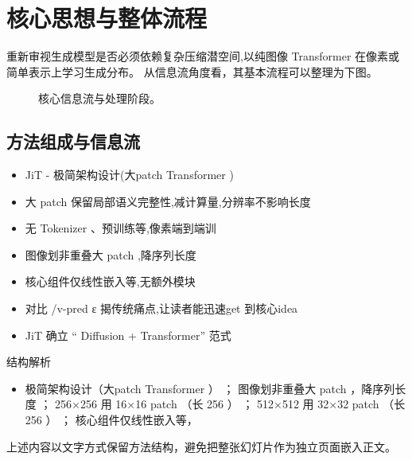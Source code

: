 \documentclass[UTF8,11pt,a4paper]{ctexart}
\begin{document}
\section{核心思想与整体流程}
重新审视生成模型是否必须依赖复杂压缩潜空间,以纯图像 Transformer 在像素或简单表示上学习生成分布。 从信息流角度看，其基本流程可以整理为下图。

\begin{figure}[H]
\centering
{}
\caption{核心信息流与处理阶段。}
\end{figure}

\subsection{方法组成与信息流}
\begin{itemize}
\item JiT - 极简架构设计(大patch Transformer )
\item 大 patch 保留局部语义完整性,减计算量,分辨率不影响长度
\item 无 Tokenizer 、预训练等,像素端到端训
\item 图像划非重叠大 patch ,降序列长度
\item 核心组件仅线性嵌入等,无额外模块
\item 对比 /v-pred ε 揭传统痛点,让读者能迅速get 到核心idea
\item JiT 确立 “ Diffusion + Transformer” 范式
\end{itemize}

\begin{keybox}{结构解析}
\begin{itemize}
\item 极简架构设计（大patch Transformer ） ； 图像划非重叠大 patch ，降序列长度 ； 256×256 用 16×16 patch （长 256 ） ； 512×512 用 32×32 patch （长 256 ） ； 核心组件仅线性嵌入等，
\end{itemize}
\end{keybox}

上述内容以文字方式保留方法结构，避免把整张幻灯片作为独立页面嵌入正文。
\end{document}
